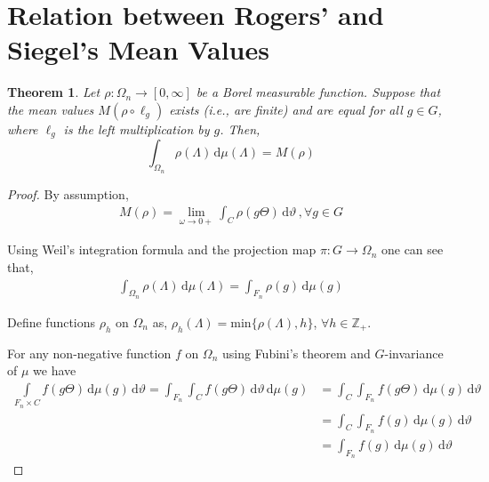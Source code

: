 \documentclass[11pt]{article}
\newtheorem{theorem}{Theorem}[section]
\theoremstyle{definition}
\theoremstyle{proof}
\begin{document}
\section{Relation between Rogers' and Siegel's Mean Values}
\begin{theorem}\label{rmveqsmv}
    Let $\rho : {\Omega}_n \to [0, \infty]$ be a Borel measurable function.
    Suppose that the mean values $M(\rho \circ \ell_g)$ exists (i.e., are finite) and are equal for all $g \in G$, where $\ell_g$ is the left multiplication by $g$.
    Then,
    \[
        \int_{{\Omega}_n} \rho (\Lambda )\, \mathrm{d} \mu (\Lambda ) = M(\rho )
    \]
\end{theorem}
\begin{proof}
    By assumption,
    \begin{align}\label{eqassumption}
        M(\rho )  = \lim_{\omega \to 0+}\int_{C}\rho (g \Theta ) \, \mathrm{d} \vartheta \, , \forall g \in G
    \end{align}

    Using Weil's integration formula and the projection map $\pi : G \to {\Omega}_n$ one can see that,
    \begin{align}\label{intrho}
        \int_{{\Omega}_n} \rho (\Lambda ) \, \mathrm{d} \mu (\Lambda ) = \int_{F_n} \rho (g) \, \mathrm{d} \mu (g)
    \end{align}

    Define functions $\rho _h$ on ${\Omega}_n$ as, $\rho _h(\Lambda ) = \text{min} \{\rho (\Lambda ), h\}$, $\forall h \in \mathbb{Z}_+$.

    For any non-negative function $f$ on ${\Omega}_n$ using Fubini's theorem and $G$-invariance of $\mu$ we have
    \begin{align*}
        \int\limits_{F_n \times C} f (g \Theta ) \, \mathrm{d} \mu (g) \, \mathrm{d} \vartheta = \int_{F_n}\int_{C} f(g \Theta ) \, \mathrm{d} \vartheta \, \mathrm{d} \mu (g) &= \int_{C} \int_{F_n}f (g \Theta ) \, \mathrm{d} \mu (g) \, \mathrm{d} \vartheta \\
        &= \int_{C} \int_{F_n} f(g) \, \mathrm{d} \mu (g) \, \mathrm{d} \vartheta \\
        &= \int_{F_n} f(g) \, \mathrm{d} \mu (g) \, \mathrm{d} \vartheta 
    \end{align*}


\end{proof}
\end{document}
